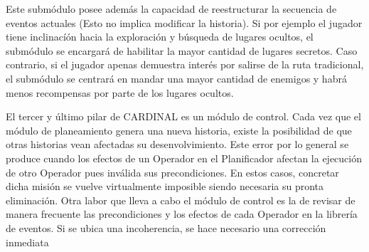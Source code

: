 Este submódulo posee además la capacidad de reestructurar la secuencia de eventos actuales (Esto no implica modificar la historia)\cite{de2018player}. Si por ejemplo el jugador tiene inclinacíón hacia la exploración y búsqueda de lugares ocultos, el submódulo se encargará de habilitar la mayor cantidad de lugares secretos. Caso contrario, si el jugador apenas demuestra interés por salirse de la ruta tradicional, el submódulo se centrará en mandar una mayor cantidad de enemigos y habrá menos recompensas por parte de los lugares ocultos.

El tercer y último pilar de CARDINAL es un módulo de control. Cada vez que el módulo de planeamiento genera una nueva historia, existe la posibilidad de que otras historias vean afectadas su desenvolvimiento. Este error por lo general se produce cuando los efectos de un Operador en el Planificador afectan la ejecución de otro Operador pues inválida sus precondiciones. En estos casos, concretar dicha misión se vuelve virtualmente imposible siendo necesaria su pronta eliminación. Otra labor que lleva a cabo el módulo de control es la de revisar de manera frecuente las precondiciones y los efectos de cada Operador  en la librería de eventos. Si se ubica una incoherencia, se hace necesario una corrección inmediata











 


















































